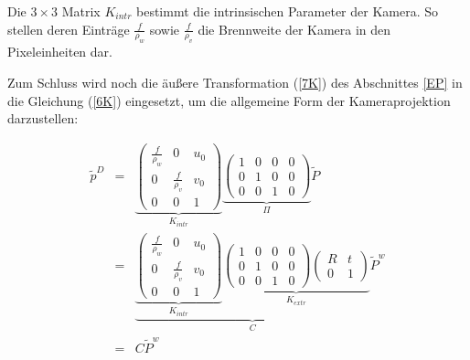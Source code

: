 {Die $ 3 \times 3$ Matrix $K_{intr}$ bestimmt die intrinsischen Parameter der Kamera.
So stellen deren Einträge $\frac{f}{\rho_w}$  sowie $\frac{f}{\rho_v}$  
die Brennweite der Kamera in den Pixeleinheiten dar.

Zum Schluss wird noch die äußere Transformation (\ref{7K}) des Abschnittes \ref{EP}
in die Gleichung (\ref{6K}) eingesetzt, um die allgemeine Form der Kamera\-projektion darzustellen:

\begin{eqnarray} \label{5K}
    \tilde {p}^D & = & 
    \underbrace{	\left ( 
        \begin{array}{ccc}
            \frac{f}{\rho_w}  	& 0 				& u_0 \\ 
            0 					& \frac{f}{\rho_v} 	& v_0 \\ 
            0 					& 0					& 1
        \end{array}
        \right )}_{K_{intr}}
    \underbrace{
        \left ( 
        \begin{array}{cccc}
            1 & 0 & 0 & 0\\ 
            0 & 1 & 0 & 0 \\ 
            0 & 0 & 1 & 0
        \end{array}
        \right )}_{\Pi}
    \tilde P \nonumber\\
    & = & 	\underbrace{
        \underbrace{	\left ( 
            \begin{array}{ccc}
                \frac{f}{\rho_w}  	& 0 				& u_0 \\ 
                0 					& \frac{f}{\rho_v} 	& v_0 \\ 
                0 					& 0					& 1
            \end{array}
            \right )}_{K_{intr}}
        \underbrace{
            \left ( 
            \begin{array}{cccc}
                1 & 0 & 0 & 0\\ 
                0 & 1 & 0 & 0 \\ 
                0 & 0 & 1 & 0
            \end{array}
            \right )
            \left (
            \begin{array}{cc}
                R & t\\
                0 & 1
            \end{array}
            \right )}_{K_{extr}}}_{C}
    \tilde P^w \nonumber \\
    & = &
    C\tilde P^w
\end{eqnarray}

}
